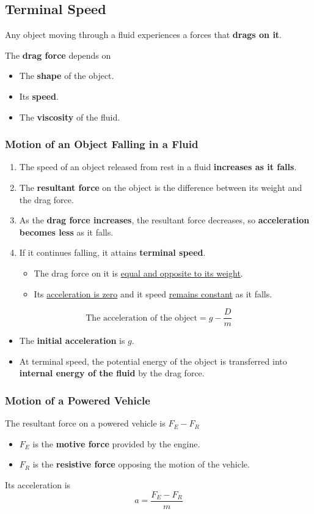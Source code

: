 \subsection{Terminal Speed}

Any object moving through a fluid experiences a forces that \textbf{drags on it}.

The \textbf{drag force} depends on
\begin{itemize}
    \item The \textbf{shape} of the object.
    \item Its \textbf{speed}.
    \item The \textbf{viscosity} of the fluid.
\end{itemize}

\subsubsection*{Motion of an Object Falling in a Fluid}

\begin{enumerate}
    \item The speed of an object released from rest in a fluid \textbf{increases as it falls}.
    \item The \textbf{resultant force} on the object is the difference between its weight and the drag force.
    \item As the \textbf{drag force increases}, the resultant force decreases, so \textbf{acceleration becomes less} as it falls.
    \item If it continues falling, it attains \textbf{terminal speed}.
        \begin{itemize}
            \item The drag force on it is \underline{equal and opposite to its weight}.
            \item Its \underline{acceleration is zero} and it speed \underline{remains constant} as it falls.
        \end{itemize}
\end{enumerate}
$$\text{The acceleration of the object}=g-\frac{D}{m}$$
\begin{itemize}
    \item The \textbf{initial acceleration} is $g$.
    \item At terminal speed, the potential energy of the object is transferred into \textbf{internal energy of the fluid} by the drag force.
\end{itemize}

\subsubsection*{Motion of a Powered Vehicle}
The resultant force on a powered vehicle is $F_E-F_R$

\begin{itemize}
    \item $F_E$ is the \textbf{motive force} provided by the engine.
    \item $F_R$ is the \textbf{resistive force} opposing the motion of the vehicle.
\end{itemize}

Its acceleration is
$$a=\frac{F_E-F_R}{m}$$
